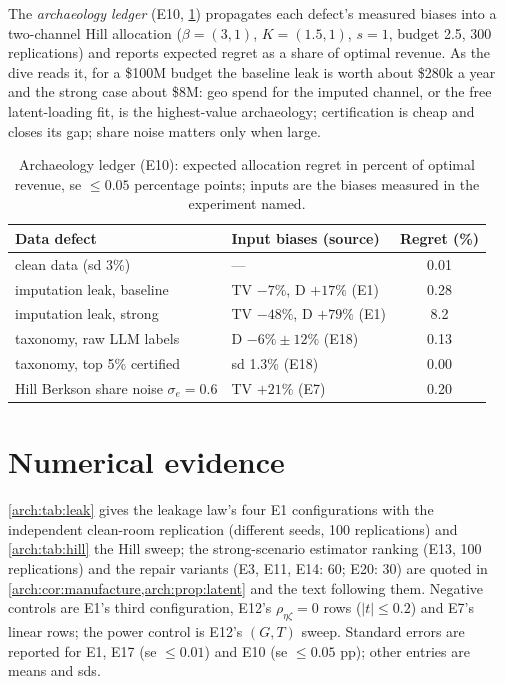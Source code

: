 The \emph{archaeology ledger} (E10, \cref{arch:tab:ledger}) propagates each defect's measured biases into a two-channel Hill allocation ($\beta = (3,1)$, $K = (1.5,1)$, $s = 1$, budget 2.5, 300 replications) and reports expected regret as a share of optimal revenue. As the dive reads it, for a \$100M budget the baseline leak is worth about \$280k a year and the strong case about \$8M: geo spend for the imputed channel, or the free latent-loading fit, is the highest-value archaeology; certification is cheap and closes its gap; share noise matters only when large.

\begin{table}[htbp]
\centering\small
\caption{Archaeology ledger (E10): expected allocation regret in percent of optimal revenue, se $\le 0.05$ percentage points; inputs are the biases measured in the experiment named.}
\label{arch:tab:ledger}
\begin{tabular}{llc}
\toprule
Data defect & Input biases (source) & Regret (\%) \\
\midrule
clean data (sd 3\%) & --- & 0.01 \\
imputation leak, baseline & TV $-7\%$, D $+17\%$ (E1) & 0.28 \\
imputation leak, strong & TV $-48\%$, D $+79\%$ (E1) & 8.2 \\
taxonomy, raw LLM labels & D $-6\% \pm 12\%$ (E18) & 0.13 \\
taxonomy, top 5\% certified & sd 1.3\% (E18) & 0.00 \\
Hill Berkson share noise $\sigma_e = 0.6$ & TV $+21\%$ (E7) & 0.20 \\
\bottomrule
\end{tabular}
\end{table}

\section{Numerical evidence}
\label{arch:sec:numerics}

\cref{arch:tab:leak} gives the leakage law's four E1 configurations with the independent clean-room replication (different seeds, 100 replications) and \cref{arch:tab:hill} the Hill sweep; the strong-scenario estimator ranking (E13, 100 replications) and the repair variants (E3, E11, E14: 60; E20: 30) are quoted in \cref{arch:cor:manufacture,arch:prop:latent} and the text following them. Negative controls are E1's third configuration, E12's $\rho_{\eta\zeta} = 0$ rows ($|t| \le 0.2$) and E7's linear rows; the power control is E12's $(G,T)$ sweep. Standard errors are reported for E1, E17 (se $\le 0.01$) and E10 (se $\le 0.05$ pp); other entries are means and sds.

